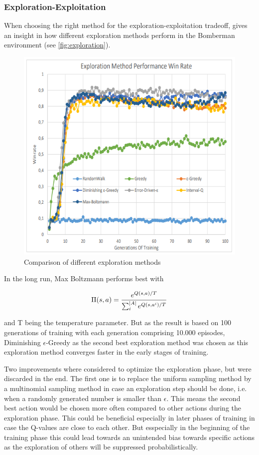 \subsubsection{Exploration-Exploitation}
\label{ch:approachBa}

When choosing the right method for the exploration-exploitation tradeoff, \cite{Kormelink2018} gives an insight in how different exploration methods perform in the Bomberman environment (see \autoref{fig:exploration}). 

\begin{figure}[ht]
	\centering
	\includegraphics[width=0.6\linewidth]{figures/exploration.PNG}
	\caption{Comparison of different exploration methods}
	\label{fig:exploration}
\end{figure}

In the long run, Max Boltzmann performs best with 

\begin{equation}
	\Pi(s,a) = \frac{e^{Q(s,a)/T}}{\sum_i^{\lvert A\rvert}e^{Q(s,a^i)/T}}
\end{equation}

and T being the temperature parameter. But as the result is based on 100 generations of training with each generation comprising 10.000 episodes, Diminishing $\epsilon$-Greedy as the second best exploration method was chosen as this exploration method converges faster in the early stages of training.

Two improvements where considered to optimize the exploration phase, but were discarded in the end. The first one is to replace the uniform sampling method by a multinomial sampling method in case an exploration step should be done, i.e. when a randomly generated number is smaller than $\epsilon$. This means the second best action would be chosen more often compared to other actions during the exploration phase. This could be beneficial especially in later phases of training in case the Q-values are close to each other. But esspecially in the beginning of the training phase this could lead towards an unintended bias towards specific actions as the exploration of others will be suppressed probabilistically.

